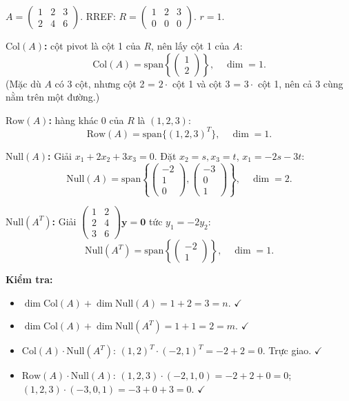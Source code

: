 \documentclass[12pt,a4paper]{article}
\begin{document}
\begin{vidu}[title={Tìm 4 cơ sở cho một ma trận}]
$A = \begin{pmatrix}1 & 2 & 3\\2 & 4 & 6\end{pmatrix}$. RREF: $R = \begin{pmatrix}1 & 2 & 3\\0 & 0 & 0\end{pmatrix}$. $r = 1$.

\medskip
\textbf{$\mathrm{Col}(A)$:} cột pivot là cột 1 của $R$, nên lấy cột 1 của $A$:
\[
  \mathrm{Col}(A) = \mathrm{span}\left\{\begin{pmatrix}1\\2\end{pmatrix}\right\}, \quad \dim = 1.
\]
(Mặc dù $A$ có 3 cột, nhưng cột 2 = $2 \cdot$ cột 1 và cột 3 = $3 \cdot$ cột 1, nên cả 3 cùng nằm trên một đường.)

\medskip
\textbf{$\mathrm{Row}(A)$:} hàng khác 0 của $R$ là $(1, 2, 3)$:
\[
  \mathrm{Row}(A) = \mathrm{span}\{(1, 2, 3)^T\}, \quad \dim = 1.
\]

\medskip
\textbf{$\mathrm{Null}(A)$:} Giải $x_1 + 2x_2 + 3x_3 = 0$. Đặt $x_2 = s, x_3 = t$, $x_1 = -2s - 3t$:
\[
  \mathrm{Null}(A) = \mathrm{span}\left\{\begin{pmatrix}-2\\1\\0\end{pmatrix}, \begin{pmatrix}-3\\0\\1\end{pmatrix}\right\}, \quad \dim = 2.
\]

\medskip
\textbf{$\mathrm{Null}(A^T)$:} Giải $\begin{pmatrix}1 & 2\\2 & 4\\3 & 6\end{pmatrix}\mathbf{y} = \mathbf{0}$ tức $y_1 = -2y_2$:
\[
  \mathrm{Null}(A^T) = \mathrm{span}\left\{\begin{pmatrix}-2\\1\end{pmatrix}\right\},\quad \dim = 1.
\]

\medskip
\textbf{Kiểm tra:}
\begin{itemize}
  \item $\dim\mathrm{Col}(A) + \dim\mathrm{Null}(A) = 1 + 2 = 3 = n$. $\checkmark$
  \item $\dim\mathrm{Col}(A) + \dim\mathrm{Null}(A^T) = 1 + 1 = 2 = m$. $\checkmark$
  \item $\mathrm{Col}(A) \cdot \mathrm{Null}(A^T)$: $(1,2)^T \cdot (-2, 1)^T = -2 + 2 = 0$. Trực giao. $\checkmark$
  \item $\mathrm{Row}(A) \cdot \mathrm{Null}(A)$: $(1,2,3) \cdot (-2,1,0) = -2 + 2 + 0 = 0$; $(1,2,3) \cdot (-3,0,1) = -3 + 0 + 3 = 0$. $\checkmark$
\end{itemize}
\end{vidu}
\end{document}
